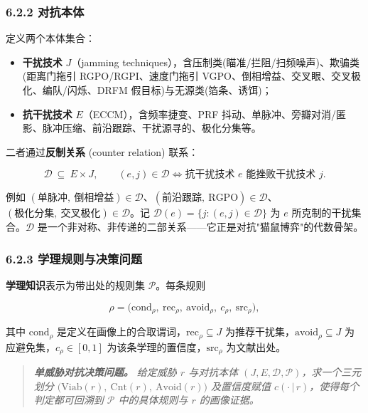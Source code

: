 \documentclass[12pt,a4paper]{ctexart}
\begin{document}
\subsubsection*{6.2.2 对抗本体}

定义两个本体集合：

\begin{itemize}[leftmargin=2em]
\item \textbf{干扰技术} $J$（jamming techniques），含压制类(瞄准/拦阻/扫频噪声)、欺骗类(距离门拖引 RGPO/RGPI、速度门拖引 VGPO、倒相增益、交叉眼、交叉极化、编队/闪烁、DRFM 假目标)与无源类(箔条、诱饵)；
\item \textbf{抗干扰技术} $E$（ECCM），含频率捷变、PRF 抖动、单脉冲、旁瓣对消/匿影、脉冲压缩、前沿跟踪、干扰源寻的、极化分集等。
\end{itemize}

二者通过\textbf{反制关系} (counter relation) 联系：

\[\mathcal{D}\ \subseteq\ E\times J,\qquad (e,j)\in\mathcal{D}\iff \text{抗干扰技术 }e\text{ 能挫败干扰技术 }j .\]

例如 $(\text{单脉冲},\ \text{倒相增益})\in\mathcal{D}$、$(\text{前沿跟踪},\ \text{RGPO})\in\mathcal{D}$、$(\text{极化分集},\ \text{交叉极化})\in\mathcal{D}$。记 $\mathcal{D}(e)=\{j:(e,j)\in\mathcal{D}\}$ 为 $e$ 所克制的干扰集合。$\mathcal{D}$ 是一个非对称、非传递的二部关系——它正是对抗"猫鼠博弈"的代数骨架。

\subsubsection*{6.2.3 学理规则与决策问题}

\textbf{学理知识}表示为带出处的规则集 $\mathcal{P}$。每条规则

\[\rho=\big(\mathrm{cond}_\rho,\ \mathrm{rec}_\rho,\ \mathrm{avoid}_\rho,\ c_\rho,\ \mathrm{src}_\rho\big),\]

其中 $\mathrm{cond}_\rho$ 是定义在画像上的合取谓词，$\mathrm{rec}_\rho\subseteq J$ 为推荐干扰集，$\mathrm{avoid}_\rho\subseteq J$ 为应避免集，$c_\rho\in[0,1]$ 为该条学理的置信度，$\mathrm{src}_\rho$ 为文献出处。

\begin{quote}\itshape \textbf{单威胁对抗决策问题。} 给定威胁 $r$ 与对抗本体 $(J,E,\mathcal{D},\mathcal{P})$，求一个三元划分 $\big(\mathrm{Viab}(r),\ \mathrm{Cnt}(r),\ \mathrm{Avoid}(r)\big)$ 及置信度赋值 $c(\cdot\,|\,r)$，使得每个判定都可回溯到 $\mathcal{P}$ 中的具体规则与 $r$ 的画像证据。\end{quote}
\end{document}
